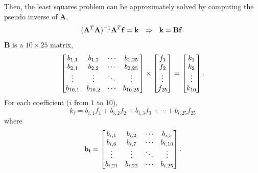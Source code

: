 \documentclass{ipol}
\numberwithin{equation}{section}
\numberwithin{table}{section}
\begin{document}
Then, the least squares problem can be approximately solved by computing the pseudo inverse of $\mathbf{A}$,
\begin{equation*}
	(\mathbf{A}^T\mathbf{A})^{-1}\mathbf{A}^T\mathbf{f} = \mathbf{k} \ \ \Rightarrow \ \ \mathbf{k} = \mathbf{B}\mathbf{f} .\\
\end{equation*}
$\mathbf{B}$ is a $10\times25$ matrix, 
\begin{equation*}
	\begin{bmatrix}
		b_{1,1}		& b_{1,2}	& \cdots	& b_{1,25}	\\
		b_{2,1}		& b_{2,2}	& \cdots	& b_{2,25}	\\
		\vdots		& \vdots	& \ddots	& \vdots	\\
		b_{10,1}	& b_{10,2}	& \cdots	& b_{10,25}
	\end{bmatrix}
	\times
	\begin{bmatrix}
		f_1		\\
		f_2		\\
		\vdots	\\
		f_{25}
	\end{bmatrix}
	=
	\begin{bmatrix}
		k_1		\\
		k_2		\\
		\vdots	\\
		k_{10}
	\end{bmatrix} .\\
\end{equation*}
For each coefficient ($i$ from $1$ to $10$), 
\begin{equation}
	\label{eq:coefficients}
	k_i = b_{i,1}f_1 + b_{i,2}f_2 + b_{i,3}f_3 + \cdots + b_{i,25}f_{25}%
\end{equation}
where
\begin{equation}
	\label{eq:b_i}
	\mathbf{b_i} = \begin{bmatrix}	b_{i,1}		& b_{i,2}	& \cdots	& b_{i,5}	\\
									b_{i,6}		& b_{i,7}	& \cdots	& b_{i,10}	\\
									\vdots		& \vdots	& \ddots	& \vdots	\\
									b_{i,21}	& b_{i,22}	& \cdots	& b_{i,25}	\\
					\end{bmatrix}.\\
\end{equation}
\end{document}
